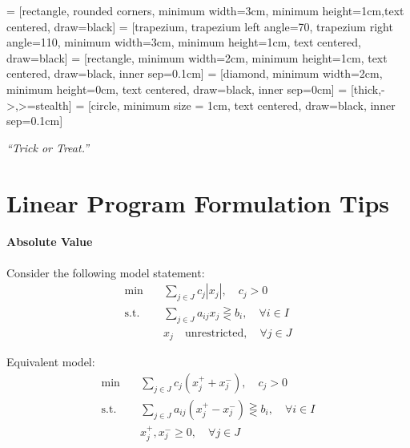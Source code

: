 
\usepackage{makecell}
\setlength{\parindent}{0pt}

\usetikzlibrary{shapes.geometric, arrows}
     = [rectangle, rounded corners, minimum width=3cm, minimum height=1cm,text centered, draw=black]
     = [trapezium, trapezium left angle=70, trapezium right angle=110, minimum width=3cm, minimum height=1cm, text centered, draw=black]
     = [rectangle, minimum width=2cm, minimum height=1cm, text centered, draw=black, inner sep=0.1cm]
     = [diamond, minimum width=2cm, minimum height=0cm, text centered, draw=black, inner sep=0cm]
     = [thick,->,>=stealth]
     = [circle, minimum size = 1cm, text centered, draw=black, inner sep=0.1cm]

\renewcommand{\docTitle}{Special Topic - Formulation Tips}
\renewcommand{\docAuthor}{Lan Peng, Ph.D.}
\renewcommand{\docAffil}{School of Management, Shanghai University, Shanghai, China}

    \titleSec

    \begin{center}
        \textit{``Trick or Treat.''}
    \end{center}

    \section{Linear Program Formulation Tips}
        \paragraph{Absolute Value}
            
            Consider the following model statement:
            \begin{align*}
                \min \quad & \sum_{j\in J}c_j|x_j|, \quad c_j > 0 \\
                \text{s.t.} \quad & \sum_{j\in J}a_{ij}x_j \gtreqless b_i, \quad \forall i\in I \\
                                  & x_j \quad \text{unrestricted}, \quad \forall j\in J 
            \end{align*}

            
            Equivalent model:
            \begin{align*}
                \min \quad & \sum_{j\in J}c_j(x_j^+ + x_j^-), \quad c_j > 0 \\
                \text{s.t.} \quad & \sum_{j\in J}a_{ij}(x_j^+ - x_j^-) \gtreqless b_i, \quad \forall i\in I \\
                                  & x_j^+, x_j^- \ge 0, \quad \forall j\in J 
            \end{align*}

